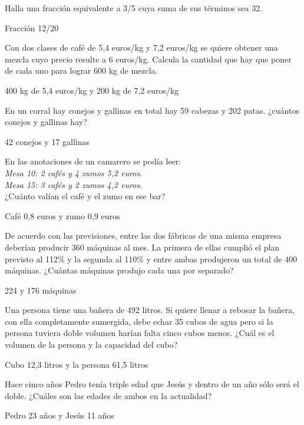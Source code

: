 \documentclass[spanish, 12pt]{exam}
\begin{document}
\begin{questions}
\question Halla una fracción equivalente a 3/5 cuya suma de sus términos sea 32.
\begin{solution} Fracción 12/20 \end{solution}

\question Con dos clases de café de 5,4 euros/kg y 7,2 euros/kg se quiere obtener una mezcla cuyo precio resulte a 6 euros/kg. Calcula la cantidad que hay que poner de cada uno para lograr 600 kg de mezcla.

\begin{solution} 400 kg de 5,4 euros/kg y 200 kg de 7,2 euros/kg \end{solution}

\question En un corral hay conejos y gallinas en total hay 59 cabezas y 202 patas. ¿cuántos conejos y gallinas hay?
\begin{solution} 42 conejos y 17 gallinas \end{solution}

\question En las anotaciones de un camarero se podía leer: \\
	\emph{Mesa 10: 2 cafés y 4 zumos 5,2 euros.\\
	Mesa 15: 3 cafés y 2 zumos 4,2 euros.}\\
¿Cuánto valían el café y el zumo en ese bar?
\begin{solution} Café 0,8 euros y zumo 0,9 euros \end{solution}

\question De acuerdo con las previsiones, entre las dos fábricas de una misma empresa deberían producir 360 máquinas al mes. La primera de ellas cumplió el plan previsto al 112\% y la segunda al 110\% y entre ambas produjeron un total de 400 máquinas. ¿Cuántas máquinas produjo cada una por separado?
\begin{solution} 224 y 176 máquinas \end{solution}

\question Una persona tiene una bañera de 492 litros. Si quiere llenar a rebosar la bañera, con ella completamente sumergida, debe echar 35 cubos de agua pero si la persona tuviera doble volumen harían falta cinco cubos menos. ¿Cuál es el volumen de la persona y la capacidad del cubo?
\begin{solution} Cubo 12,3 litros y la persona 61,5 litros \end{solution}

\question Hace cinco años Pedro tenía triple edad que Jesús y dentro de un año sólo será el doble. ¿Cuáles son las edades de ambos en la actualidad?
\begin{solution} Pedro 23 años y Jesús 11 años \end{solution}


\end{questions}
\end{document}
